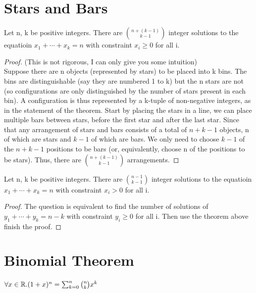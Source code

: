 \section{Stars and Bars}
\begin{theorem}
    Let n, k be positive integers. There are ${n+(k-1) \choose k-1}$ integer solutions to the equatioin 
    $x_1 + \cdots + x_k=n$ with constraint $x_i \geq 0$ for all i.
\end{theorem}
\begin{proof}
    (This is not rigorous, I can only give you some intuition)\\
    Suppose there are n objects (represented by stars) to be placed into k bins. 
    The bins are distinguishable (say they are numbered 1 to k) but the n stars are not (so configurations are only distinguished by the number of stars present in each bin). 
    A configuration is thus represented by a k-tuple of non-negative integers, as in the statement of the theorem. Start by placing the stars in a line,
    we can place multiple bars between stars, before the first star and after the last star. 
    Since that any arrangement of stars and bars consists of a total of $n + k - 1$ objects, n of which are stars and $k-1$ of which are bars.
    We only need to choose $k - 1$ of the $n + k - 1$ positions to be bars (or, equivalently, choose n of the positions to be stars).
    Thus, there are ${n+(k-1) \choose k-1}$ arrangements.
\end{proof}

\begin{corollary}
    Let n, k be positive integers. There are ${n-1 \choose k-1}$ integer solutions to the equatioin 
    $x_1 + \cdots + x_k=n$ with constraint $x_i > 0$ for all i.
\end{corollary}
\begin{proof}
    The question is equivalent to find the number of solutions of $y_1 + \cdots + y_k=n-k$ with constraint $y_i \geq 0$ for all i.
    Then use the theorem above finish the proof.
\end{proof}

\section{Binomial Theorem}

\begin{theorem}
    $\forall x \in \mathbb{R}. (1+x)^n=\sum_{k=0}^{n}{n \choose k}x^k$
\end{theorem}


